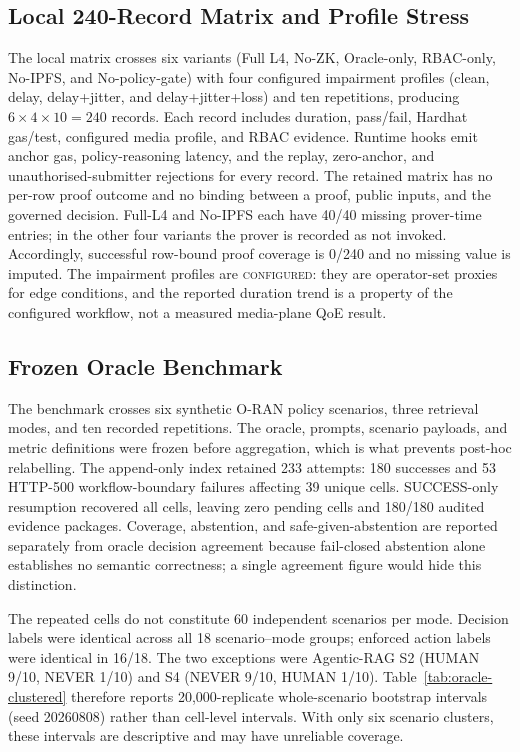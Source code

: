 \documentclass[journal]{IEEEtran}
\newif\ifshowrevisions
\newcommand{\rev}[1]{{\ifshowrevisions\color{blue}\else\color{black}\fi #1}}
\newcommand{\Econfigured}{\textsc{configured}}
\begin{document}
\subsection{Local 240-Record Matrix and Profile Stress}
\label{sec:matrix-detail}
The local matrix crosses six variants (Full L4, No-ZK, Oracle-only,
RBAC-only, No-IPFS, and No-policy-gate) with four configured impairment
profiles (clean, delay, delay+jitter, and delay+jitter+loss) and ten
repetitions, producing $6\times4\times10=240$ records. Each record includes
duration, pass/fail, Hardhat gas/test, configured media profile, and RBAC
evidence. Runtime hooks emit anchor gas, policy-reasoning latency, and the
replay, zero-anchor, and unauthorised-submitter rejections for every record.
The retained matrix has no per-row proof outcome and no binding between a
proof, public inputs, and the governed decision. Full-L4 and No-IPFS each have
40/40 missing prover-time entries; in the other four variants the prover is
recorded as not invoked. Accordingly, successful row-bound proof coverage is
0/240 and no missing value is imputed. The impairment profiles are \Econfigured{}:
they are operator-set proxies for edge conditions, and the reported duration
trend is a property of the configured workflow, not a measured media-plane
QoE result.

\subsection{Frozen Oracle Benchmark}
\label{sec:oracle-detail}
The benchmark crosses six synthetic O-RAN policy scenarios, three retrieval
modes, and \rev{ten recorded repetitions}. The oracle, prompts, scenario
payloads, and metric definitions were frozen before aggregation, which is what
prevents post-hoc relabelling. The append-only index retained 233 attempts:
180 successes and 53 HTTP-500 workflow-boundary failures affecting 39 unique
cells. SUCCESS-only resumption recovered all cells, leaving zero pending cells
and 180/180 audited evidence packages. Coverage, abstention, and
safe-given-abstention are reported separately from oracle decision agreement
\rev{because fail-closed abstention alone establishes no semantic correctness;
a single agreement figure would hide this distinction.}

The repeated cells do not constitute 60 independent scenarios per mode.
Decision labels were identical across all 18 scenario--mode groups; enforced
action labels were identical in 16/18. The two exceptions were Agentic-RAG S2
(HUMAN 9/10, NEVER 1/10) and S4 (NEVER 9/10, HUMAN 1/10). Table~\ref{tab:oracle-clustered}
therefore reports 20{,}000-replicate whole-scenario bootstrap intervals (seed
20260808) rather than cell-level intervals. With only six scenario clusters,
these intervals are descriptive and may have unreliable coverage.
\end{document}
